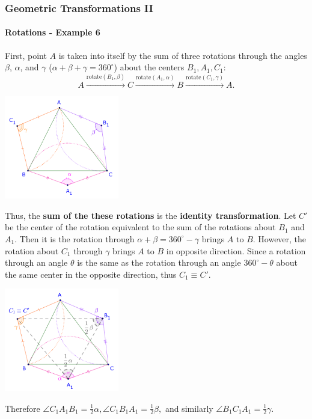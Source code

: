 \documentclass[8pt,xcolor=table,dvipsnames]{beamer}
\providecommand{\half}{\frac{1}{2}}
\newcommand{\dg}{^\circ}
\begin{document}
\begin{frame}[t]
    \frametitle{Geometric Transformations II}
    \framesubtitle{Rotations - Example 6}
    \begin{overprint}
        First, point $A$ is taken into itself by the sum of three rotations through the angles $\beta$, $\alpha$, and $\gamma$
        ($\alpha + \beta + \gamma = 360\dg$) about the centers $B_1, A_1, C_1$:
        \[
            A \stackrel{\text{rotate}(B_1, \beta)}{\rightarrow} C \stackrel{\text{rotate}(A_1, \alpha)}{\rightarrow} B 
            \stackrel{\text{rotate}(C_1, \gamma)}{\rightarrow} A. 
        \]
        \begin{center}
            \includegraphics[width=5cm]{./svg/pdf/rotation-6b.pdf}
        \end{center}
        Thus, the \textbf{sum of the these rotations} is the \textbf{identity transformation}.
        Let $C'$ be the center of the rotation equivalent to the sum of the rotations about $B_1$ and $A_1$.
        Then it is the rotation through $\alpha + \beta = 360\dg - \gamma$ brings $A$ to $B$.
        \bigbreak
        However, the rotation about $C_1$ through $\gamma$ brings $A$ to $B$ in opposite direction.
        Since a rotation through an angle $\theta$ is the same as the rotation through an angle $360\dg - \theta$
        about the same center in the opposite direction, thus $C_1 \equiv C'.$
        \begin{center}
            \includegraphics[width=5cm]{./svg/pdf/rotation-6c.pdf}
        \end{center}
        Therefore $\angle C_1A_1B_1 = \half \alpha, \angle C_1B_1A_1 = \half \beta,$ and similarly $\angle B_1C_1A_1 = \half \gamma.$ 
    \end{overprint}
\end{frame}
\end{document}
